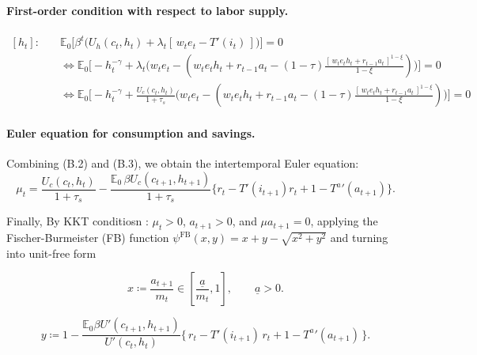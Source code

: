 \documentclass[11pt]{article}
\begin{document}
\paragraph{First-order condition with respect to labor supply.}
\begin{equation}
\begin{aligned}
[h_t]: \quad &
\mathbb{E}_0 \Big[ \beta^t \big( U_h(c_t,h_t) + \lambda_t[\,w_t e_t - T'(i_t)\,] \big) \Big] = 0 \\
&\iff \mathbb{E}_0 \Big[ -h_t^{-\gamma} 
+ \lambda_t \big( w_t e_t 
- (w_t e_t h_t + r_{t-1}a_t 
- (1-\tau)\tfrac{[\,w_t e_t h_t + r_{t-1}a_t\,]^{1-\xi}}{1-\xi}) \big) \Big] = 0 \\
&\iff \mathbb{E}_0 \Big[ -h_t^{-\gamma} 
+ \frac{U_c(c_t,h_t)}{1+\tau_s}\big( w_t e_t 
- (w_t e_t h_t + r_{t-1}a_t 
- (1-\tau)\tfrac{[\,w_t e_t h_t + r_{t-1}a_t\,]^{1-\xi}}{1-\xi}) \big) \Big] = 0
\end{aligned}
\end{equation}

\paragraph{Euler equation for consumption and savings.}
Combining (B.2) and (B.3), we obtain the intertemporal Euler equation:
\begin{equation}
\mu_t 
= \frac{U_c(c_t,h_t)}{1+\tau_s}
- \frac{\mathbb{E}_0 \, \beta U_c(c_{t+1},h_{t+1})}{1+\tau_s}
\Big\{ r_t - T'(i_{t+1})r_t + 1 - {T^a}'(a_{t+1}) \Big\}.
\end{equation}

Finally, By KKT conditiosn : $\mu_t>0$, $a_{t+1}>0$, and $\mu a_{t+1}=0$, applying the Fischer-Burmeister (FB) function $\psi^{\text{FB}}(x, y) = x+y-\sqrt{x^2+y^2} $ and turning into unit-free form 

\begin{equation}
x \coloneqq \frac{a_{t+1}}{m_t}\in [\frac{\underline{a}}{m_t}, 1], 
\qquad \underline{a} > 0.
\end{equation}

\begin{equation}
y \coloneqq 
1 - \frac{\mathbb{E}_0 \beta U'(c_{t+1},h_{t+1})}{U'(c_t,h_t)}
\Big\{\, r_t - T'(i_{t+1})\,r_t + 1 - {T^a}'(a_{t+1}) \,\Big\}.
\end{equation}

\pagebreak
\end{document}
